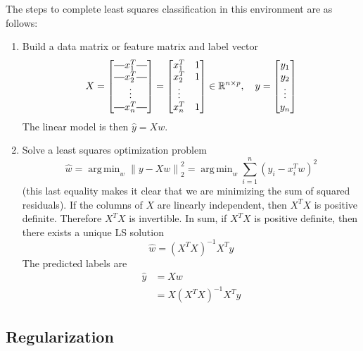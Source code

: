 \documentclass[12pt]{article}
\theoremstyle{definition}
\DeclareMathOperator*{\argmin}{arg\,min}
\newcommand{\R}{\mathbb{R}}
\newcommand{\norm}[1]{\left\lVert#1\right\rVert}
\newcommand*{\horzbar}{\rule[.5ex]{2.5ex}{0.5pt}}
\begin{document}
The steps to complete least squares classification in this environment are as follows:
\begin{enumerate}
	\item Build a data matrix or feature matrix and label vector
	\begin{equation}
		X = 
		\begin{bmatrix}
		\horzbar x_1^T \horzbar \\
		\horzbar x_2^T \horzbar \\
		\vdots \\
		\horzbar x_n^T \horzbar
		\end{bmatrix} =
		\begin{bmatrix}
		x_1^T & 1 \\
		x_2^T & 1 \\
		\vdots \\
		x_n^T & 1
		\end{bmatrix}
		\in \R^{n \times p},
		\quad
		y = 
		\begin{bmatrix}
		y_1 \\
		y_2 \\
		\vdots \\
		y_n
		\end{bmatrix}
	\end{equation}
	The linear model is then $\hat{y} = Xw$.
	\item Solve a least squares optimization problem 
	\begin{equation}
	 	\hat{w} = \argmin_w \norm{y - Xw}_2^2 = \argmin_w \sum_{i=1}^n (y_i- x_i^T w)^2
	 \end{equation} 
	 (this last equality makes it clear that we are minimizing the sum of squared residuals). If the columns of $X$ are linearly independent, then $X^T X$ is positive definite. Therefore $X^T X$ is invertible. In sum, if $X^T X$ is positive definite, then there exists a unique LS solution 
	 \begin{equation}
	 	\hat{w} = (X^T X)^{-1} X^T y
	 \end{equation}
	 The predicted labels are
	 \begin{align*}
	 \hat{y} &= Xw \\
	 &= X (X^T X)^{-1} X^T y
	 \end{align*}
\end{enumerate}

\subsection{Regularization}
\end{document}
